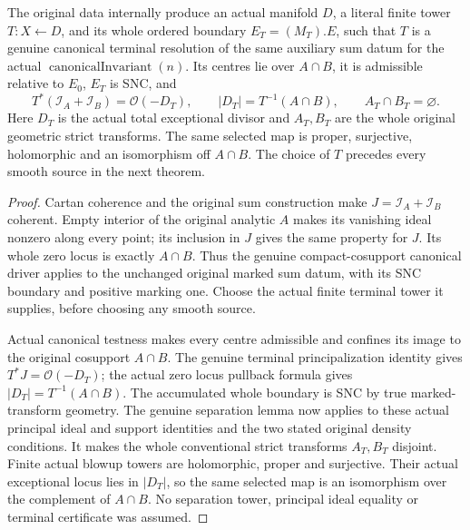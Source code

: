 \begin{theorem}
\label{hir:original-canonical-sum-selected-terminal-separator}
\leanok
The original data internally produce an actual manifold $D$, a literal
finite tower $T:X\leftarrow D$, and its whole ordered boundary
$E_T=(M_T).E$, such that $T$ is a genuine canonical terminal resolution
of the same auxiliary sum datum for the actual
$\operatorname{canonicalInvariant}(n)$. Its centres lie over $A\cap B$,
it is admissible relative to $E_0$, $E_T$ is SNC, and
\[
 T^*(\mathcal I_A+\mathcal I_B)=\mathcal O(-D_T),\qquad
 |D_T|=T^{-1}(A\cap B),\qquad A_T\cap B_T=\varnothing.
\]
Here $D_T$ is the actual total exceptional divisor and $A_T,B_T$ are
the whole original geometric strict transforms. The same selected map
is proper, surjective, holomorphic and an isomorphism off $A\cap B$.
The choice of $T$ precedes every smooth source in the next theorem.
\end{theorem}
\begin{proof}
Cartan coherence and the original sum construction make
$J=\mathcal I_A+\mathcal I_B$ coherent. Empty interior of the original
analytic $A$ makes its vanishing ideal nonzero along every point; its
inclusion in $J$ gives the same property for $J$. Its whole zero locus
is exactly $A\cap B$. Thus the genuine compact-cosupport canonical
driver applies to the unchanged original marked sum datum, with its
SNC boundary and positive marking one. Choose the actual finite terminal
tower it supplies, before choosing any smooth source.

Actual canonical testness makes every centre admissible and confines its
image to the original cosupport $A\cap B$. The genuine terminal
principalization identity gives $T^*J=\mathcal O(-D_T)$; the actual zero
locus pullback formula gives $|D_T|=T^{-1}(A\cap B)$. The accumulated
whole boundary is SNC by true marked-transform geometry. The genuine
separation lemma now applies to these actual principal ideal and support
identities and the two stated original density conditions. It makes the
whole conventional strict transforms $A_T,B_T$ disjoint. Finite actual
blowup towers are holomorphic, proper and surjective. Their actual
exceptional locus lies in $|D_T|$, so the same selected map is an
isomorphism over the complement of $A\cap B$. No separation tower,
principal ideal equality or terminal certificate was assumed.
\end{proof}

